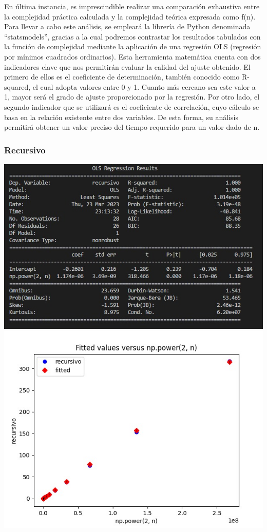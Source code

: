 \documentclass[11pt]{article}
\begin{document}
En última instancia, es imprescindible realizar una comparación
exhaustiva entre la complejidad práctica calculada y la complejidad
teórica expresada como f(n). Para llevar a cabo este análisis, se
empleará la librería de Python denominada ``statsmodels'', gracias a la
cual podremos contrastar los resultados tabulados con la función de
complejidad mediante la aplicación de una regresión OLS (regresión por
mínimos cuadrados ordinarios). Esta herramienta matemática cuenta con
dos indicadores clave que nos permitirán evaluar la calidad del ajuste
obtenido. El primero de ellos es el coeficiente de determinación,
también conocido como R-squared, el cual adopta valores entre 0 y 1.
Cuanto más cercano sea este valor a 1, mayor será el grado de ajuste
proporcionado por la regresión. Por otro lado, el segundo indicador que
se utilizará es el coeficiente de correlación, cuyo cálculo se basa en
la relación existente entre dos variables. De esta forma, su análisis
permitirá obtener un valor preciso del tiempo requerido para un valor
dado de n.

\hypertarget{recursivo}{%
\subsubsection{Recursivo}\label{recursivo}}

\includegraphics{OLSTABLA1.jpg} \includegraphics{OLSGRAFICO1.jpg}
\end{document}
